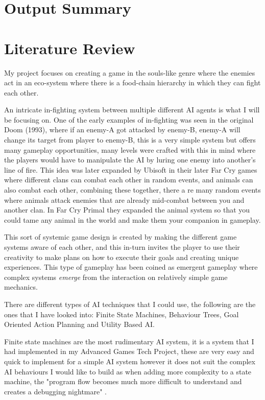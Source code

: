 \documentclass[11pt]{report}
\begin{document}
\chapter{Output Summary}

\chapter{Literature Review}
My project focuses on creating a game in the souls-like genre where the enemies act in an eco-system where there is a food-chain hierarchy in which they can fight each other.

An intricate in-fighting system between multiple different AI agents is what I will be focusing on. One of the early examples of in-fighting was seen in the original Doom (1993)\cite{doom93}, where if an enemy-A got attacked by enemy-B, enemy-A will change its target from player to enemy-B, this is a very simple system but offers many gameplay opportunities, many levels were crafted with this in mind where the players would have to manipulate the AI by luring one enemy into another's line of fire.
This idea was later expanded by Ubisoft in their later Far Cry games where different clans can combat each other in random events, and animals can also combat each other, combining these together, there a re many random events where animals attack enemies that are already mid-combat between you and another clan. In Far Cry Primal they expanded the animal system so that you could tame any animal in the world and make them your companion in gameplay.

This sort of systemic game design is created by making the different game systems aware of each other, and this in-turn invites the player to use their creativity to make plans on how to execute their goals and creating unique experiences. This type of gameplay has been coined as emergent gameplay where complex systems \textit{emerge} from the interaction on relatively simple game mechanics.\cite{emergentGameplay}

There are different types of AI techniques that I could use, the following are the ones that I have looked into: Finite State Machines, Behaviour Trees, Goal Oriented Action Planning and Utility Based AI.

Finite state machines are the most rudimentary AI system, it is a system that I had implemented in my Advanced Games Tech Project, these are very easy and quick to implement for a simple AI system however it does not suit the complex AI behaviours I would like to build as when adding more complexity to a state machine, the "program flow becomes much more difficult to understand and creates a debugging nightmare" \cite{gameAiByExample}.
\end{document}
